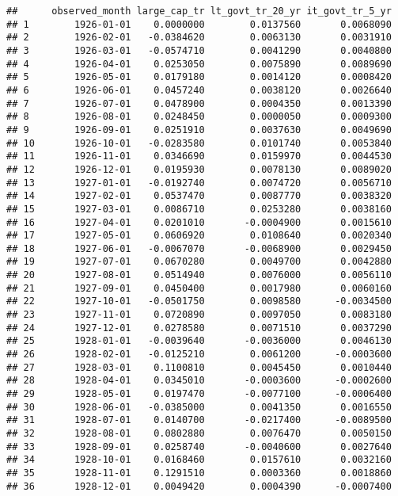 \documentclass[
]{article}
\begin{document}
\begin{verbatim}
##      observed_month large_cap_tr lt_govt_tr_20_yr it_govt_tr_5_yr
## 1        1926-01-01    0.0000000        0.0137560       0.0068090
## 2        1926-02-01   -0.0384620        0.0063130       0.0031910
## 3        1926-03-01   -0.0574710        0.0041290       0.0040800
## 4        1926-04-01    0.0253050        0.0075890       0.0089690
## 5        1926-05-01    0.0179180        0.0014120       0.0008420
## 6        1926-06-01    0.0457240        0.0038120       0.0026640
## 7        1926-07-01    0.0478900        0.0004350       0.0013390
## 8        1926-08-01    0.0248450        0.0000050       0.0009300
## 9        1926-09-01    0.0251910        0.0037630       0.0049690
## 10       1926-10-01   -0.0283580        0.0101740       0.0053840
## 11       1926-11-01    0.0346690        0.0159970       0.0044530
## 12       1926-12-01    0.0195930        0.0078130       0.0089020
## 13       1927-01-01   -0.0192740        0.0074720       0.0056710
## 14       1927-02-01    0.0537470        0.0087770       0.0038320
## 15       1927-03-01    0.0086710        0.0253280       0.0038160
## 16       1927-04-01    0.0201010       -0.0004900       0.0015610
## 17       1927-05-01    0.0606920        0.0108640       0.0020340
## 18       1927-06-01   -0.0067070       -0.0068900       0.0029450
## 19       1927-07-01    0.0670280        0.0049700       0.0042880
## 20       1927-08-01    0.0514940        0.0076000       0.0056110
## 21       1927-09-01    0.0450400        0.0017980       0.0060160
## 22       1927-10-01   -0.0501750        0.0098580      -0.0034500
## 23       1927-11-01    0.0720890        0.0097050       0.0083180
## 24       1927-12-01    0.0278580        0.0071510       0.0037290
## 25       1928-01-01   -0.0039640       -0.0036000       0.0046130
## 26       1928-02-01   -0.0125210        0.0061200      -0.0003600
## 27       1928-03-01    0.1100810        0.0045450       0.0010440
## 28       1928-04-01    0.0345010       -0.0003600      -0.0002600
## 29       1928-05-01    0.0197470       -0.0077100      -0.0006400
## 30       1928-06-01   -0.0385000        0.0041350       0.0016550
## 31       1928-07-01    0.0140700       -0.0217400      -0.0089500
## 32       1928-08-01    0.0802880        0.0076470       0.0050150
## 33       1928-09-01    0.0258740       -0.0040600       0.0027640
## 34       1928-10-01    0.0168460        0.0157610       0.0032160
## 35       1928-11-01    0.1291510        0.0003360       0.0018860
## 36       1928-12-01    0.0049420        0.0004390      -0.0007400

\end{verbatim}
\end{document}
